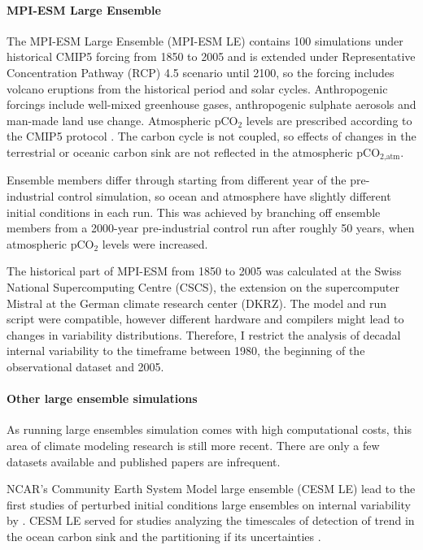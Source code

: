 \documentclass[12pt]{article}
\begin{document}
 
\paragraph{MPI-ESM Large Ensemble} The MPI-ESM Large Ensemble (MPI-ESM LE) contains 100 simulations under historical CMIP5 forcing from 1850 to 2005 and is extended under Representative Concentration Pathway (RCP) 4.5 scenario until 2100, so the forcing includes volcano eruptions from the historical period and solar cycles. Anthropogenic forcings include well-mixed greenhouse gases, anthropogenic sulphate aerosols and man-made land use change. Atmospheric pCO$_2$ levels are prescribed according to the CMIP5 protocol \citep{Taylor2012}. The carbon cycle is not coupled, so effects of changes in the terrestrial or oceanic carbon sink are not reflected in the atmospheric pCO$_{\text{2,atm}}$. 

Ensemble members differ through starting from different year of the pre-industrial control simulation, so ocean and atmosphere have slightly different initial conditions in each run. This was achieved by branching off ensemble members from a 2000-year pre-industrial control run after roughly 50 years, when atmospheric pCO$_2$ levels were increased. 

The historical part of MPI-ESM from 1850 to 2005 was calculated at the Swiss National Supercomputing Centre (CSCS), the extension on the supercomputer Mistral at the German climate research center (DKRZ). The model and run script were compatible, however different hardware and compilers might lead to changes in variability distributions. Therefore, I restrict the analysis of decadal internal variability to the timeframe between 1980, the beginning of the observational dataset and 2005.
 


\paragraph{Other large ensemble simulations} 

As running large ensembles simulation comes with high computational costs, this area of climate modeling research is still more recent. There are only a few datasets available and published papers are infrequent.

NCAR's Community Earth System Model large ensemble (CESM LE) \citep{Kay2015} lead to the first studies of perturbed initial conditions large ensembles on internal variability by \cite{Deser2012}. CESM LE served for studies analyzing the timescales of detection of trend in the ocean carbon sink \citep{McKinley2016} and the partitioning if its uncertainties \citep{Lovenduski2016}. 
\end{document}
